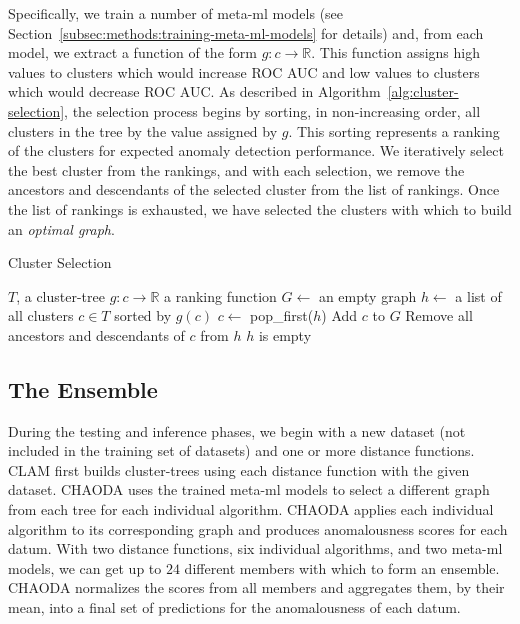 Specifically, we train a number of meta-ml models (see Section~\ref{subsec:methods:training-meta-ml-models} for details) and, from each model, we extract a function of the form $g : c \rightarrow \mathbb{R}$.
This function assigns high values to clusters which would increase ROC AUC and low values to clusters which would decrease ROC AUC.
As described in Algorithm~\ref{alg:cluster-selection}, the selection process begins by sorting, in non-increasing order, all clusters in the tree by the value assigned by $g$.
This sorting represents a ranking of the clusters for expected anomaly detection performance.
We iteratively select the best cluster from the rankings, and with each selection, we remove the ancestors and descendants of the selected cluster from the list of rankings.
Once the list of rankings is exhausted, we have selected the clusters with which to build an \textit{optimal graph}.

\begin{algorithm}[h]
    \caption{Cluster Selection}
    \label{alg:cluster-selection}
\begin{algorithmic}[1]
    \REQUIRE $T$, a cluster-tree
    \REQUIRE $g : c \rightarrow \mathbb{R}$ a ranking function
    \STATE $G \gets$ an empty graph
    \STATE $h \gets$ a list of all clusters $c \in T$ sorted by $g(c)$
    \REPEAT
        \STATE $c \gets$ pop\_first($h$)
        \STATE Add $c$ to $G$
        \STATE Remove all ancestors and descendants of $c$ from $h$
    \UNTIL $h$ is empty
\end{algorithmic}
\end{algorithm}



\subsection{The Ensemble}
\label{subsec:methods:the-ensemble}

During the testing and inference phases, we begin with a new dataset (not included in the training set of datasets) and one or more distance functions.
CLAM first builds cluster-trees using each distance function with the given dataset.
CHAODA uses the trained meta-ml models to select a different graph from each tree for each individual algorithm.
CHAODA applies each individual algorithm to its corresponding graph and produces anomalousness scores for each datum.
With two distance functions, six individual algorithms, and two meta-ml models, we can get up to $24$ different members with which to form an ensemble.
CHAODA normalizes the scores from all members and aggregates them, by their mean, into a final set of predictions for the anomalousness of each datum.


